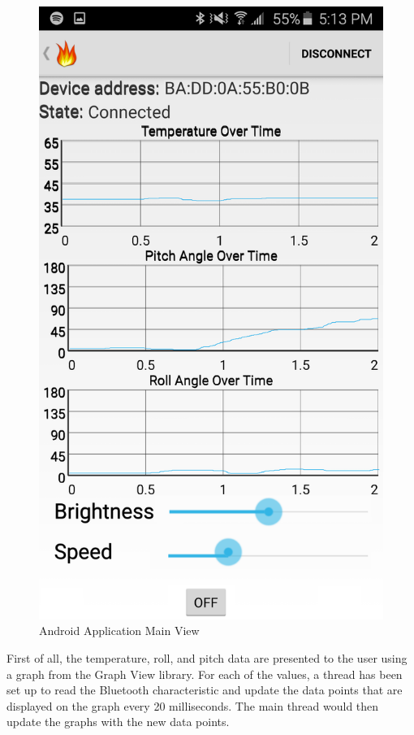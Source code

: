 \documentclass[12pt]{article}
\begin{document}
\begin{figure}[!htb]
 \centering
 \includegraphics[scale=0.15]{images/android.png}
 \caption{Android Application Main View}
 \label{fig:android}
\end{figure}

First of all, the temperature, roll, and pitch data are presented to the user using a graph from the Graph View library. For each of the values, a thread has been set up to read the Bluetooth characteristic and update the data points that are displayed on the graph every 20 milliseconds. The main thread would then update the graphs with the new data points.
\end{document}
